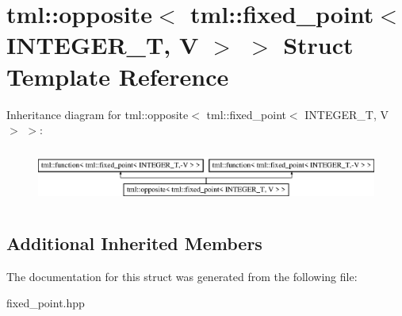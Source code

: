\hypertarget{structtml_1_1opposite_3_01tml_1_1fixed__point_3_01INTEGER__T_00_01V_01_4_01_4}{\section{tml\+:\+:opposite$<$ tml\+:\+:fixed\+\_\+point$<$ I\+N\+T\+E\+G\+E\+R\+\_\+\+T, V $>$ $>$ Struct Template Reference}
\label{structtml_1_1opposite_3_01tml_1_1fixed__point_3_01INTEGER__T_00_01V_01_4_01_4}
}
Inheritance diagram for tml\+:\+:opposite$<$ tml\+:\+:fixed\+\_\+point$<$ I\+N\+T\+E\+G\+E\+R\+\_\+\+T, V $>$ $>$\+:\begin{figure}[H]
\begin{center}
\leavevmode
\includegraphics[height=1.854305cm]{structtml_1_1opposite_3_01tml_1_1fixed__point_3_01INTEGER__T_00_01V_01_4_01_4}
\end{center}
\end{figure}
\subsection*{Additional Inherited Members}


The documentation for this struct was generated from the following file\+:\begin{DoxyCompactItemize}
\item 
fixed\+\_\+point.\+hpp\end{DoxyCompactItemize}
